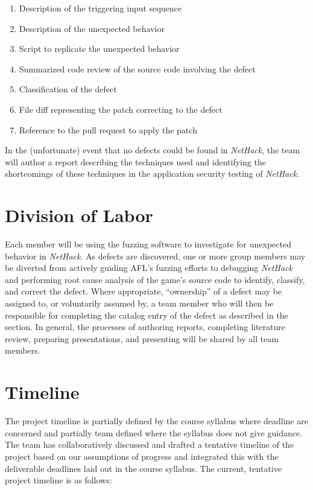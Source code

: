 \documentclass[12pt]{diazessay}
\begin{document}
\begin{enumerate}

  \item Description of the triggering input sequence
  \item Description of the unexpected behavior
  \item Script to replicate the unexpected behavior
  \item Summarized code review of the source code involving the defect
  \item Classification of the defect
  \item File diff representing the patch correcting to the defect
  \item Reference to the pull request to apply the patch

\end{enumerate}

In the (unfortunate) event that no defects could be found in \emph{NetHack}, the team will author a report describing the techniques used and identifying the shortcomings of these techniques in the application security testing of \emph{NetHack}.


\section*{Division of Labor}

Each member will be using the fuzzing software to investigate for unexpected behavior in \emph{NetHack}.
As defects are discovered, one or more group members may be diverted from actively guiding AFL's fuzzing efforts to debugging \emph{NetHack} and performing root cause analysis of the game's source code to identify, classify, and correct the defect.
Where appropriate, ``ownership'' of a defect may be assigned to, or voluntarily assumed by, a team member who will then be responsible for completing the catalog entry of the defect as described in the  section.
In general, the processes of authoring reports, completing literature review, preparing presentations, and presenting will be shared by all team members.


\section*{Timeline}

The project timeline is partially defined by the course syllabus where deadline are concerned and partially team defined where the syllabus does not give guidance.
The team has collaboratively discussed and drafted a tentative timeline of the project based on our assumptions of progress and integrated this with the deliverable deadlines laid out in the course syllabus. The current, tentative project timeline is as follows:
\end{document}
